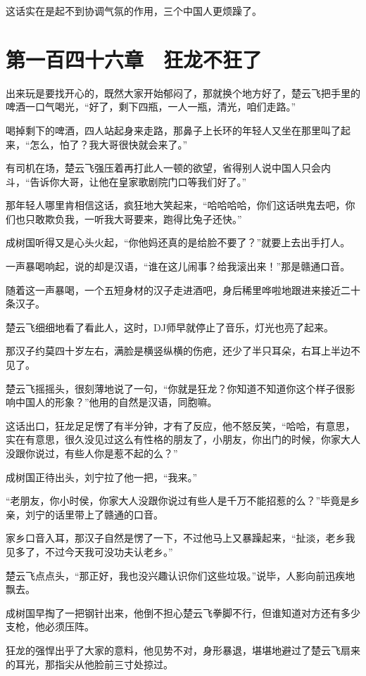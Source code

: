 这话实在是起不到协调气氛的作用，三个中国人更烦躁了。

\section{第一百四十六章　狂龙不狂了}

出来玩是要找开心的，既然大家开始郁闷了，那就换个地方好了，楚云飞把手里的啤酒一口气喝光，“好了，剩下四瓶，一人一瓶，清光，咱们走路。”

喝掉剩下的啤酒，四人站起身来走路，那鼻子上长环的年轻人又坐在那里叫了起来，“怎么，怕了？我大哥很快就会来了。”

有司机在场，楚云飞强压着再打此人一顿的欲望，省得别人说中国人只会内斗，“告诉你大哥，让他在皇家歌剧院门口等我们好了。”

那年轻人哪里肯相信这话，疯狂地大笑起来，“哈哈哈哈，你们这话哄鬼去吧，你们也只敢欺负我，一听我大哥要来，跑得比兔子还快。”

成树国听得又是心头火起，“你他妈还真的是给脸不要了？”就要上去出手打人。

一声暴喝响起，说的却是汉语，“谁在这儿闹事？给我滚出来！”那是赣通口音。

随着这一声暴喝，一个五短身材的汉子走进酒吧，身后稀里哗啦地跟进来接近二十条汉子。

楚云飞细细地看了看此人，这时，DJ师早就停止了音乐，灯光也亮了起来。

那汉子约莫四十岁左右，满脸是横竖纵横的伤疤，还少了半只耳朵，右耳上半边不见了。

楚云飞摇摇头，很刻薄地说了一句，“你就是狂龙？你知道不知道你这个样子很影响中国人的形象？”他用的自然是汉语，同胞嘛。

这话出口，狂龙足足愣了有半分钟，才有了反应，他不怒反笑，“哈哈，有意思，实在有意思，很久没见过这么有性格的朋友了，小朋友，你出门的时候，你家大人没跟你说过，有些人你是惹不起的么？”

成树国正待出头，刘宁拉了他一把，“我来。”

“老朋友，你小时侯，你家大人没跟你说过有些人是千万不能招惹的么？”毕竟是乡亲，刘宁的话里带上了赣通的口音。

家乡口音入耳，那汉子自然是愣了一下，不过他马上又暴躁起来，“扯淡，老乡我见多了，不过今天我可没功夫认老乡。”

楚云飞点点头，“那正好，我也没兴趣认识你们这些垃圾。”说毕，人影向前迅疾地飘去。

成树国早掏了一把钢针出来，他倒不担心楚云飞拳脚不行，但谁知道对方还有多少支枪，他必须压阵。

狂龙的强悍出乎了大家的意料，他见势不对，身形暴退，堪堪地避过了楚云飞扇来的耳光，那指尖从他脸前三寸处掠过。

